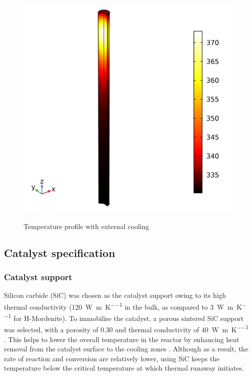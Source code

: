 \begin{figure}
    \centering
        \includegraphics[width=\linewidth]{figures/simple-tube-temperature.png}
        \label{fig:Adiabatic-with-cooling}
        \caption{Temperature profile with external cooling}
\end{figure}   


\subsection{Catalyst specification}
\subsubsection{Catalyst support}
Silicon carbide (SiC) was chosen as the catalyst support owing to its high thermal conductivity (\SI{120}{\W\per\m\per\K} in the bulk, as compared to \SI{3}{\W\per\m\per\K} for H-Mordenite). To immobilise the catalyst, a porous sintered SiC support was selected, with a porosity of 0.30 and thermal conductivity of \SI{40}{\W\per\m\per\K} \cite{jang_thermophysical_2007}. This helps to lower the overall temperature in the reactor by enhancing heat removal from the catalyst surface to the cooling zones \cite{ledoux_silicon_2001}. Although as a result, the rate of reaction and conversion are relatively lower, using SiC keeps the temperature below the critical temperature at which thermal runaway initiates.


